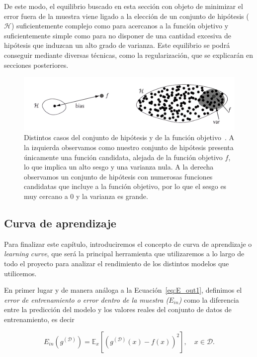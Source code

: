De este modo, el equilibrio buscado en esta sección con objeto de minimizar el error fuera de la muestra viene ligado a la elección de un conjunto de hipótesis ($\mathcal{H}$) suficientemente complejo como para acercanos a la función objetivo y suficientemente simple como para no disponer de una cantidad excesiva de hipótesis que induzcan un alto grado de varianza. Este equilibrio se podrá conseguir mediante diversas técnicas, como la regularización, que se explicarán en secciones posteriores.\newline

\begin{figure}[h]
    \centering
    \includegraphics[width=0.7\linewidth]{img/bias-variance.png}
    \caption[Distintos casos del conjunto de hipótesis y de la función objetivo.] {Distintos casos del conjunto de hipótesis y de la función objetivo~\cite{Mostafa2012}. A la izquierda observamos como nuestro conjunto de hipótesis presenta únicamente una función candidata, alejada de la función objetivo $f$, lo que implica un alto sesgo y una varianza nula. A la derecha observamos un conjunto de hipótesis con numerosas funciones candidatas que incluye a la función objetivo, por lo que el sesgo es muy cercano a $0$ y la varianza es grande.}\label{fig:bias-variance}
\end{figure}

\subsection{Curva de aprendizaje}

Para finalizar este capítulo, introduciremos el concepto de curva de aprendizaje o \emph{learning curve}, que será la principal herramienta que utilizaremos a lo largo de todo el proyecto para analizar el rendimiento de los distintos modelos que utilicemos.\newline

En primer lugar y de manera análoga a la Ecuación~\eqref{eq:E_out1}, definimos el \emph{error de entrenamiento o error dentro de la muestra ($E_{in}$)} como la diferencia entre la predicción del modelo y los valores reales del conjunto de datos de entrenamiento, es decir

\begin{equation}\label{eq:E_in1}
    E_{in}(g^{\mathcal{(D)}}) = \mathbb{E}_{x}[{(g^{\mathcal{(D)}}(x) - f(x))}^2], \quad x \in \mathcal{D}.
\end{equation}\newline

